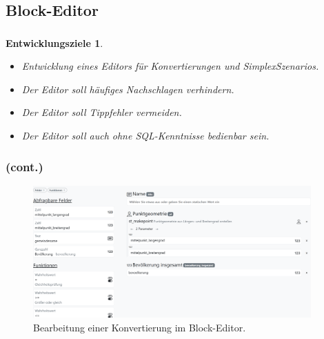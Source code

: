 \subsection{Block-Editor}
\begin{frame}
  \frametitle{\currentsectionname}

  \newtheorem{dev}{Entwicklungsziele}
  \begin{dev}
    \begin{itemize}
      \item Entwicklung eines Editors für Konvertierungen und SimplexSzenarios.
      \item Der Editor soll häufiges Nachschlagen verhindern.
      \item Der Editor soll Tippfehler vermeiden.
      \item Der Editor soll auch ohne SQL-Kenntnisse bedienbar sein.
    \end{itemize}
  \end{dev}


\end{frame}

\begin{frame}
  \frametitle{\currentsectionname{} (cont.)}

  \begin{figure}
    \begin{center}
      \includegraphics[width=0.95\textwidth]{assets/buffet-simple.png}
    \end{center}
    \caption{Bearbeitung einer Konvertierung im Block-Editor.}
  \end{figure}

\end{frame}
